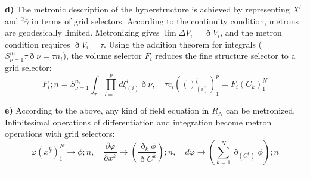 \documentclass[11pt,a4paper,oneside]{article}
\newcommand{\ethop}{\eth}
\newcommand{\hr}{\par\vspace{2em}\noindent\rule{\linewidth}{0.4pt}\par\vspace{2em}}
\begin{document}
\textbf{d)} The metronic description of the hyperstructure is achieved by representing $X^{\underline{l}}$ and ${}^2\bar{\gamma}$ in terms of grid selectors.
According to the continuity condition, metrons are geodesically limited. Metronizing gives $\lim \Delta V_i = \ethop V_i$, and the metron condition requires $\ethop V_i = \tau$.
Using the addition theorem for integrals ($S_{\nu = 1}^{n_i} \tau \ethop \nu = \tau n_i$), the volume selector $F_i$ reduces the fine structure selector to a grid selector:
\begin{equation}
    F_i; n = S_{\nu = 1}^{n_i}\int_{\tau}\prod_{l = 1}^pd \xi_{(i)}^l \ethop\nu, \quad \tau c_i(()_{(i)}^{\underline{l} })_1^p = F_i(C_k)_1^N \tag{M20}
\end{equation}

\textbf{e)} According to the above, any kind of field equation in $R_N$ can be metronized. Infinitesimal operations of differentiation and integration become metron operations with grid selectors:
\begin{equation}
    \varphi(x^{\underline {k}})_1^N \to \phi; n, \quad \frac {\partial \varphi} {\partial x^k} \to \left(\frac {\ethop_k \phi} {\ethop C^{\underline{k}}}\right); n, \quad d\varphi \to \left(\sum_{k=1}^N \ethop_{(C^{\underline{k}})} \phi\right); n \tag{M20a}
\end{equation}

\hr
\end{document}
